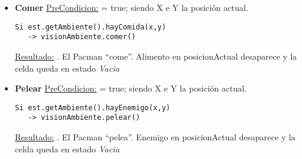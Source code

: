 \begin{itemize}
\item \textbf{Comer}\newline
\underline{PreCondicion:}  = true;
siendo X e Y la posición actual.

\begin{verbatim}
Si est.getAmbiente().hayComida(x,y)
   -> visionAmbiente.comer()
\end{verbatim}

\underline{Resultado:} . El Pacman ``come''.
Alimento en posicionActual desaparece y la celda queda en estado \textit{Vacia}


\item \textbf{Pelear}\newline
\underline{PreCondicion:}  = true;
siendo X e Y la posición actual.

\begin{verbatim}
Si est.getAmbiente().hayEnemigo(x,y)
   -> visionAmbiente.pelear()
\end{verbatim}

\underline{Resultado:} . El Pacman ``pelea''.
Enemigo en posicionActual desaparece y la celda queda en estado \textit{Vacia}

\end{itemize}
